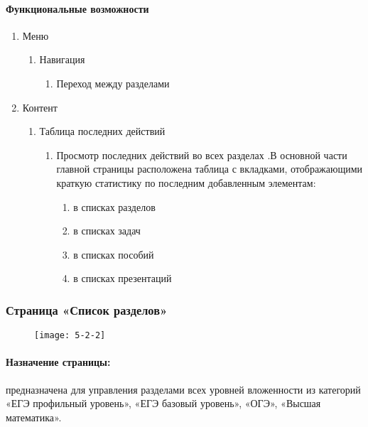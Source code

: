 \paragraph{Функциональные возможности}
\begin{enumerate}
	\item Меню
	\begin{enumerate}
		\item Навигация
		\begin{enumerate}
			\item Переход между разделами
		\end{enumerate}
	\end{enumerate}

	\item Контент
	\begin{enumerate}
		\item Таблица последних действий
		\begin{enumerate}
			\item Просмотр последних действий во всех разделах .В основной части главной страницы расположена таблица с вкладками, отображающими краткую статистику по последним добавленным элементам:
			\begin{enumerate}
				\item  в списках разделов
				\item  в списках задач
				\item  в списках пособий
				\item  в списках презентаций
			\end{enumerate}
		\end{enumerate}
	\end{enumerate}
\end{enumerate}

\subsubsection{Страница «Список разделов»}
\begin{figure}[H]
	\texttt{[image: 5-2-2]}
\end{figure}
\paragraph{Назначение страницы:} предназначена для управления разделами всех уровней вложенности из категорий «ЕГЭ профильный уровень», «ЕГЭ базовый уровень», «ОГЭ», «Высшая математика».

